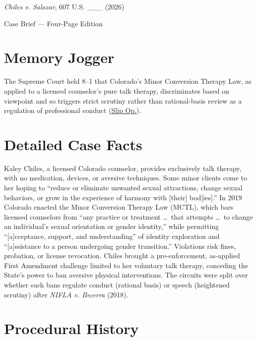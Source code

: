 \documentclass[12pt]{article}
\begin{document}
\begin{center}
{\LARGE \textit{Chiles v. Salazar}, 607 U.S. \_\_\_ (2026)\par}
\vspace{0.8em}
{\large Case Brief --- Four-Page Edition\par}
\end{center}
\vspace{1em}

\section{Memory Jogger}

The Supreme Court held 8--1 that Colorado's Minor Conversion Therapy Law, as applied to a licensed counselor's pure talk therapy, discriminates based on viewpoint and so triggers strict scrutiny rather than rational-basis review as a regulation of professional conduct (\href{https://www.supremecourt.gov/opinions/25pdf/24-539_fd9g.pdf}{Slip Op.}).

\section{Detailed Case Facts}

Kaley Chiles, a licensed Colorado counselor, provides exclusively talk therapy, with no medication, devices, or aversive techniques. Some minor clients come to her hoping to ``reduce or eliminate unwanted sexual attractions, change sexual behaviors, or grow in the experience of harmony with [their] bod[ies].'' In 2019 Colorado enacted the Minor Conversion Therapy Law (MCTL), which bars licensed counselors from ``any practice or treatment \ldots\ that attempts \ldots\ to change an individual's sexual orientation or gender identity,'' while permitting ``[a]cceptance, support, and understanding'' of identity exploration and ``[a]ssistance to a person undergoing gender transition.'' Violations risk fines, probation, or license revocation. Chiles brought a pre-enforcement, as-applied First Amendment challenge limited to her voluntary talk therapy, conceding the State's power to ban aversive physical interventions. The circuits were split over whether such bans regulate conduct (rational basis) or speech (heightened scrutiny) after \textit{NIFLA v. Becerra} (2018).

\section{Procedural History}
\end{document}
